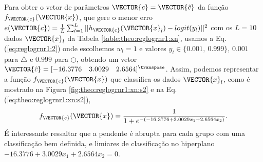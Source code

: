\begin{SolutionT}\label{sol:theo:reglogrnr1:s2}
Para obter o vetor de parâmetros $\VECTOR{c}=\VECTOR{\hat{c}}$ da função $f_{\VECTOR{c}}(\VECTOR{x})$, 
que gere o menor erro $e(\VECTOR{c}) = \frac{1}{L} \sum_{l=1}^{L} ||h_{\VECTOR{c}}(\VECTOR{x}_l)-logit(y_l)||^2$
com os $L=10$ dados $\VECTOR{x}_l$ da Tabela \ref{table:theo:reglogrnr1:xn},
usamos a Eq. (\ref{eq:reglogrnr1:2}) onde escolhemos $w_l=1$ e valores $y_l \in \{0.001,~ 0.999\}$,
$0.001$ para $\bigtriangleup$ e $0.999$ para $\bigcirc$,
obtendo um vetor $\VECTOR{\hat{c}}=[-16.3776\quad 3.0029\quad 2.6564]^{\transpose}$. 
Assim, podemos representar a função $f_{\VECTOR{c}}(\VECTOR{x})$ que classifica os dados $\VECTOR{x}_l$, 
como é mostrado na Figura \ref{fig:theo:reglogrnr1:xn:s2} e na Eq. (\ref{eq:theo:reglogrnr1:xn:s2}),
\begin{equation}\label{eq:theo:reglogrnr1:xn:s2}
f_{\VECTOR{c}}(\VECTOR{x})= \frac{1}{1+e^{-(-16.3776+3.0029 x_1 +2.6564 x_2)}}.
\end{equation}
É interessante ressaltar que a pendente é abrupta para cada grupo com uma classificação bem definida,
e limiares de classificação no hiperplano $-16.3776+3.0029 x_1 +2.6564 x_2=0$.
\end{SolutionT}

